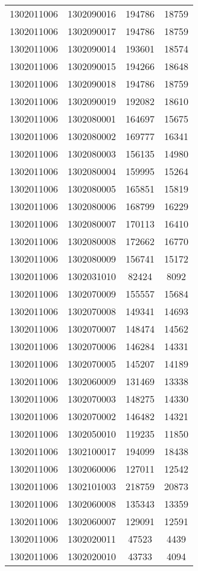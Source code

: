 \begin{longtable}{llcc}
1302011006 & 1302090016 & 194786 & 18759\\
1302011006 & 1302090017 & 194786 & 18759\\
1302011006 & 1302090014 & 193601 & 18574\\
1302011006 & 1302090015 & 194266 & 18648\\
1302011006 & 1302090018 & 194786 & 18759\\
1302011006 & 1302090019 & 192082 & 18610\\
1302011006 & 1302080001 & 164697 & 15675\\
1302011006 & 1302080002 & 169777 & 16341\\
1302011006 & 1302080003 & 156135 & 14980\\
1302011006 & 1302080004 & 159995 & 15264\\
1302011006 & 1302080005 & 165851 & 15819\\
1302011006 & 1302080006 & 168799 & 16229\\
1302011006 & 1302080007 & 170113 & 16410\\
1302011006 & 1302080008 & 172662 & 16770\\
1302011006 & 1302080009 & 156741 & 15172\\
1302011006 & 1302031010 & 82424 & 8092\\
1302011006 & 1302070009 & 155557 & 15684\\
1302011006 & 1302070008 & 149341 & 14693\\
1302011006 & 1302070007 & 148474 & 14562\\
1302011006 & 1302070006 & 146284 & 14331\\
1302011006 & 1302070005 & 145207 & 14189\\
1302011006 & 1302060009 & 131469 & 13338\\
1302011006 & 1302070003 & 148275 & 14330\\
1302011006 & 1302070002 & 146482 & 14321\\
1302011006 & 1302050010 & 119235 & 11850\\
1302011006 & 1302100017 & 194099 & 18438\\
1302011006 & 1302060006 & 127011 & 12542\\
1302011006 & 1302101003 & 218759 & 20873\\
1302011006 & 1302060008 & 135343 & 13359\\
1302011006 & 1302060007 & 129091 & 12591\\
1302011006 & 1302020011 & 47523 & 4439\\
1302011006 & 1302020010 & 43733 & 4094\\

\end{longtable}
